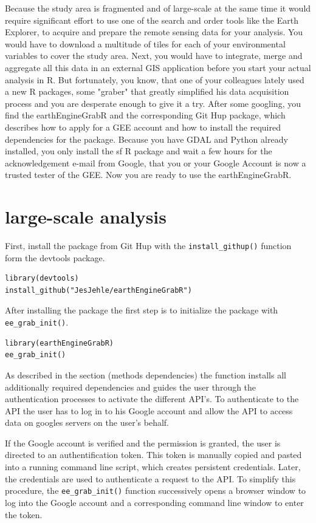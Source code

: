 Because the study area is fragmented and of large-scale at the same time it would require significant effort to use one of the search and order tools like the Earth Explorer, to acquire and prepare the remote sensing data for your analysis. You would have to download a multitude of tiles for each of your environmental variables to cover the study area. Next, you would have to integrate, merge and aggregate all this data in an external GIS application before you start your actual analysis in R. But fortunately, you know, that one of your colleagues lately used a new R packages, some "graber" that greatly simplified his data acquisition process and you are desperate enough to give it a try. After some googling, you find the earthEngineGrabR and the corresponding Git Hup package, which describes how to apply for a GEE account and how to install the required dependencies for the package. Because you have GDAL and Python already installed, you only install the sf R package and wait a few hours for the acknowledgement e-mail from Google, that you or your Google Account is now a trusted tester of the GEE. Now you are ready to use the earthEngineGrabR.

\section{large-scale analysis}

First, install the package from Git Hup with the \texttt{install\_githup()} function form the devtools package.

\begin{lstlisting}
library(devtools)
install_github("JesJehle/earthEngineGrabR")
\end{lstlisting}

After installing the package the first step is to initialize the package with \texttt{ee\_grab\_init()}. 

\begin{lstlisting}
library(earthEngineGrabR)
ee_grab_init()
\end{lstlisting}

As described in the section (methods dependencies) the function installs all additionally required dependencies and guides the user through the authentication processes to activate the different API's. To authenticate to the API the user has to log in to his Google account and allow the API to access data on googles servers on the user's behalf. 


If the Google account is verified and the permission is granted, the user is directed to an authentification token. This token is manually copied and pasted into a running command line script, which creates persistent credentials. Later, the credentials are used to authenticate a request to the API. To simplify this procedure, the \texttt{ee\_grab\_init()} function successively opens a browser window to log into the Google account and a corresponding command line window to enter the token. 

